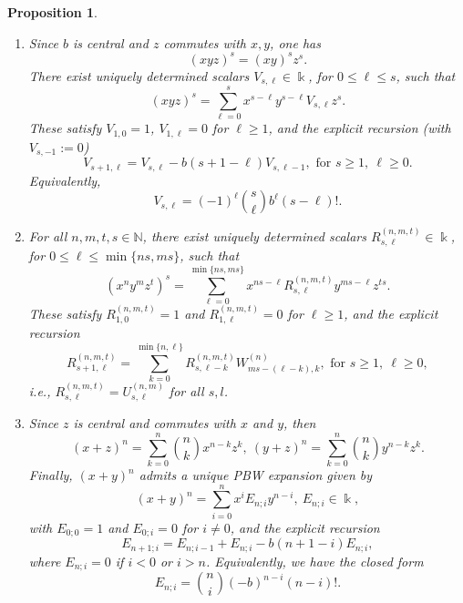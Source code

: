 \documentclass{amsart}
\newtheorem{proposition}[theorem]{Proposition}
\theoremstyle{definition}
\theoremstyle{remark}
\numberwithin{equation}{section}
\begin{document}
\begin{proposition}
\begin{enumerate}
\item [\rm (3)] Since $b$ is central and $z$ commutes with $x,y$, one has
\[
(xyz)^s=(xy)^s z^s.
\]
There exist uniquely determined scalars $V_{s,\ell}\in\Bbbk$, for $0\le \ell\le s$, such that
\begin{equation}\label{Vdefcase5iii}
(xyz)^s=\sum_{\ell=0}^{s} x^{ s-\ell} y^{ s-\ell} V_{s,\ell} z^{s}.
\end{equation}
These satisfy $V_{1,0}=1$, $V_{1,\ell}=0$ for $\ell\ge 1$, and the explicit recursion (with $V_{s,-1}:=0$)
\begin{equation}\label{Vreccase5iii}
V_{s+1,\ell}=V_{s,\ell}-b (s+1-\ell) V_{s,\ell-1}, \text{ for } s\ge 1,\ \ell\ge 0.
\end{equation}
Equivalently, 
\begin{equation}\label{Vclosedcase5iii}
V_{s,\ell}=(-1)^{\ell}\binom{s}{\ell} b^{\ell} (s-\ell)!.
\end{equation}

\item [\rm (4)] For all $n,m,t,s\in\mathbb N$, there exist uniquely determined scalars $R^{(n,m,t)}_{s,\ell}\in\Bbbk$,
for $0\le \ell\le \min\{ns,ms\}$, such that
\begin{equation}\label{Rdefcase5iii}
(x^n y^m z^t)^s=\sum_{\ell=0}^{\min\{ns,ms\}} x^{ns-\ell} R^{(n,m,t)}_{s,\ell} y^{ms-\ell}z^{ts}.
\end{equation}
These satisfy $R^{(n,m,t)}_{1,0}=1$ and $R^{(n,m,t)}_{1,\ell}=0$ for $\ell\ge 1$, and the explicit recursion
\begin{equation}\label{Rreccase5iii}
R^{(n,m,t)}_{s+1,\ell}=\sum_{k=0}^{\min\{n,\ell\}}R^{(n,m,t)}_{s,\ell-k} W^{(n)}_{ms-(\ell-k), k}, \text{ for } s\ge 1,\ \ell\ge 0,
\end{equation}
i.e., $R^{(n,m,t)}_{s,\ell}=U^{(n,m)}_{s,\ell}$ for all $s, l$.

\item [\rm (5)] Since $z$ is central and commutes with $x$ and $y$, then  
\[
(x+z)^n=\sum_{k=0}^{n}\binom{n}{k}x^{n-k}z^{k},\ (y+z)^n=\sum_{k=0}^{n}\binom{n}{k}y^{n-k}z^{k}.
\]
Finally, $(x+y)^n$ admits a unique PBW expansion given by 
\begin{equation}\label{Edefcase5iii}
(x+y)^n=\sum_{i=0}^{n} x^{i}E_{n;i} y^{ n-i}, \ E_{n;i}\in\Bbbk,
\end{equation}
with $E_{0;0}=1$ and $E_{0;i}=0$ for $i\neq 0$, and the explicit recursion
\begin{equation}\label{Ereccase5iii}
E_{n+1;i}=E_{n;i-1}+E_{n;i}-b (n+1-i) E_{n;i},
\end{equation}
where $E_{n;i}=0$ if $i<0$ or $i>n$. Equivalently, we have the closed form
\begin{equation}\label{Eclosedcase5iii}
E_{n;i}=\binom{n}{i} ( -b)^{ n-i} (n-i)!.
\end{equation}
\end{enumerate}
\end{proposition}
\end{document}
